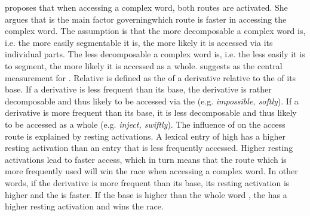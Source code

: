 \cite{Hay.2001,Hay.2003} proposes that when accessing a complex word, both routes are activated. She argues that  is the main factor governing\linebreak which route is faster in accessing the complex word. The assumption is that the more decomposable a complex word is, i.e. the more easily segmentable it is, the more likely it is accessed via its individual parts. The less decomposable a complex word is, i.e.  the less easily it is to segment, the more likely it is accessed as a whole. \cite{Hay.2001,Hay.2003} suggests  as the central measurement for . Relative  is defined as the  of a derivative relative to the  of its base. If a derivative is less frequent than its base, the derivative is rather decomposable and thus likely to be accessed via the  (e.g. \textit{impossible, softly}).  If a derivative is more frequent than its base, it is less decomposable and thus likely to be accessed as a whole (e.g. \textit{inject, swiftly}). 
The influence of  on the access route is explained by resting activations. A lexical entry of high  has a higher resting activation than an entry that is less frequently accessed. Higher resting activations lead to faster access, which in turn means that the route which is more frequently used will win the race when accessing a complex word. In other words, if the derivative is more frequent than its base, its resting activation is higher and the  is faster. If the base  is higher than the whole word , the  has a higher resting activation and wins the race.

